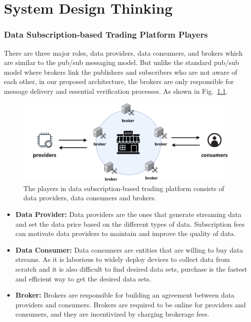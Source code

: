 \clearpage
{}

\newpage
{}
\chapter{System Design Thinking}
\pagestyle{plain}

\begin{spacing}{2.0}
\label{section:design_thinking}
\subsection{Data Subscription-based Trading Platform Players}
There are three major roles, data providers, data consumers, and brokers which are similar to the pub/sub messaging model. But unlike the standard pub/sub model where brokers link the publishers and subscribers who are not aware of each other, in our proposed architecture, the brokers are only responsible for message delivery and essential verification processes. As shown in Fig.~\ref{fig:pub_sub_model}.

\begin{figure}[H]
    \centering
    \includegraphics[width=4.5in]{img/pub_sub_model}
    \caption{The players in data subscription-based trading platform consists of data providers, data consumers and brokers.}
    \label{fig:pub_sub_model}
\end{figure}

\begin{itemize}
\item \textbf{Data Provider: }
Data providers are the ones that generate streaming data and set the data price based on the different types of data. Subscription fees can motivate data providers to maintain and improve the quality of data.
\item \textbf{Data Consumer: }
Data consumers are entities that are willing to buy data streams. As it is laborious to widely deploy devices to collect data from scratch and it is also difficult to find desired data sets, purchase is the fastest and efficient way to get the desired data sets.
\item \textbf{Broker: }
Brokers are responsible for building an agreement between data providers and consumers. Brokers are required to be online for providers and consumers, and they are incentivized by charging brokerage fees.
\end{itemize}


\end{spacing}

